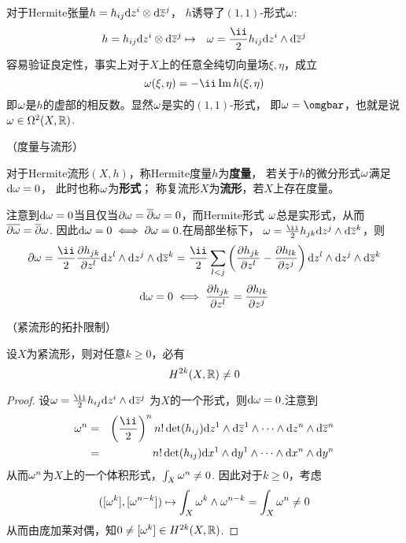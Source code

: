 对于Hermite张量$h=h_{ij}\mathrm{d} z^i\otimes \mathrm{d}\overline{z}^j$，
$h$诱导了$(1,1)$-形式$\omega$:
\begin{eqnarray*}
  h=h_{ij}\td z^i\ten\td\zbar^j
&\mapsto&
  \omg=\frac{\ii}{2}
  h_{ij}\td z^i\wedge\td\zbar^j
\end{eqnarray*}
容易验证良定性，事实上对于$X$上的任意全纯切向量场$\xi,\eta$，成立
$$
  \omg(\xi,\eta)=-\ii\im h(\xi,\eta)
$$
即$\omega$是$h$的虚部的相反数。显然$\omega$是实的$(1,1)$-形式，
即$\omg=\omgbar$，也就是说$\omega\in\Omega^2(X,\mathbb{R})$.

\begin{definition}（\Kahler 度量与\Kahler 流形）

对于Hermite流形$(X,h)$，称Hermite度量$h$为\textbf{\Kahler 度量}，
若关于$h$的微分形式$\omega$满足$\mathrm{d}\omega=0$，
此时也称$\omega$为\textbf{\Kahler 形式}；
称复流形$X$为\textbf{\Kahler 流形}，若$X$上存在\Kahler 度量。
\end{definition}


注意到$\mathrm{d}\omega=0$当且仅当$\partial\omega=\overline{\partial}\omega=0$，而Hermite形式
$\omega$总是实形式，从而$\overline{\partial\omega}=\overline{\partial}\omega$.
因此$\mathrm{d}\omega=0\iff\partial\omega=0$.在局部坐标下，
$\omg=\frac{\ii}{2}h_{jk}\td z^j\wedge\td\zbar^k$，则
$$
  \p\omg
=
  \frac{\ii}{2}
  \pfrac{h_{jk}}{z^l}
    \td z^l\wedge\td z^j\wedge\td\zbar^k
=
  \frac{\ii}{2}
  \sum_{l<j}
    \left(
      \pfrac{h_{jk}}{z^l}
     -\pfrac{h_{lk}}{z^j}
    \right)
    \td z^l\wedge\td z^j\wedge\td\zbar^k
$$
$$
  \mathrm{d}\omega=0\iff
  \frac{\partial h_{jk}} {\partial z^l} = \frac{\partial h_{lk}} {\partial z^j}
$$

\begin{prop}（紧\Kahler 流形的拓扑限制）
\label{紧Kahler流形的拓扑限制-prop}

设$X$为紧\Kahler 流形，则对任意$k\geq 0$，必有
$$H^{2k}(X,\mathbb{R})\neq 0$$
\end{prop}

\begin{proof}
设$\omg=\frac{\ii}{2}h_{ij}\td z^i\wedge\td\zbar^j$
为$X$的一个\Kahler 形式，则$\mathrm{d}\omega=0$.注意到
\begin{eqnarray*}
     \omg^n
&=&
     \left(\frac{\ii}{2}\right)^n
     n!\det(h_{ij})
     \td z^1\wedge\td\zbar^1
     \wedge\cdots\wedge
     \td z^n\wedge\td\zbar^n\\
&=&
     n!\det(h_{ij})
     \td x^1\wedge\td y^1
     \wedge\cdots\wedge
     \td x^n\wedge\td y^n
\end{eqnarray*}
从而$\omega^n$为$X$上的一个体积形式，$\int_X\omega^n\neq 0$.
因此对于$k\geq 0$，考虑
$$
  ([\omega^k],[\omega^{n-k}])
\mapsto
  \int_X\omega^k\wedge\omega^{n-k}
=
  \int_X\omega^n\neq 0
$$
从而由庞加莱对偶，知$0\neq[\omega^k]\in H^{2k}(X,\mathbb{R})$.
\end{proof}

